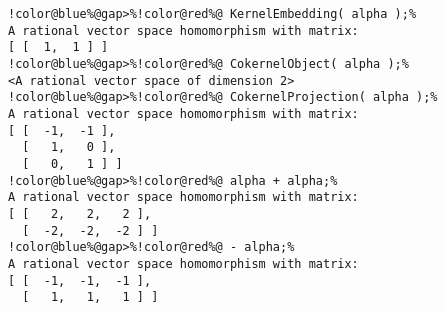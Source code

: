 \begin{Verbatim}[commandchars=!@\%,frame=single]
!color@blue%@gap>%!color@red%@ KernelEmbedding( alpha );%
A rational vector space homomorphism with matrix:
[ [  1,  1 ] ]
!color@blue%@gap>%!color@red%@ CokernelObject( alpha );%
<A rational vector space of dimension 2>
!color@blue%@gap>%!color@red%@ CokernelProjection( alpha );%
A rational vector space homomorphism with matrix: 
[ [  -1,  -1 ],
  [   1,   0 ],
  [   0,   1 ] ]
!color@blue%@gap>%!color@red%@ alpha + alpha;%
A rational vector space homomorphism with matrix: 
[ [   2,   2,   2 ],
  [  -2,  -2,  -2 ] ]
!color@blue%@gap>%!color@red%@ - alpha;%
A rational vector space homomorphism with matrix: 
[ [  -1,  -1,  -1 ],
  [   1,   1,   1 ] ]
\end{Verbatim}
